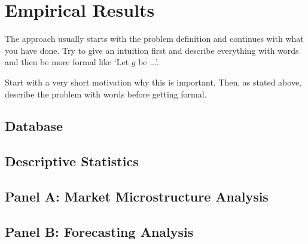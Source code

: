 \chapter{Empirical Results}\label{chap:mainresults}
The approach usually starts with the problem definition and continues with what you have done. Try to give an intuition first and describe everything with words and then be more formal like `Let $g$ be ...'.

Start with a very short motivation why this is important. Then, as stated above, describe the problem with words before getting formal.
\section{Database}







\section{Descriptive Statistics}

\section{Panel A: Market Microstructure Analysis}

\section{Panel B: Forecasting Analysis}
